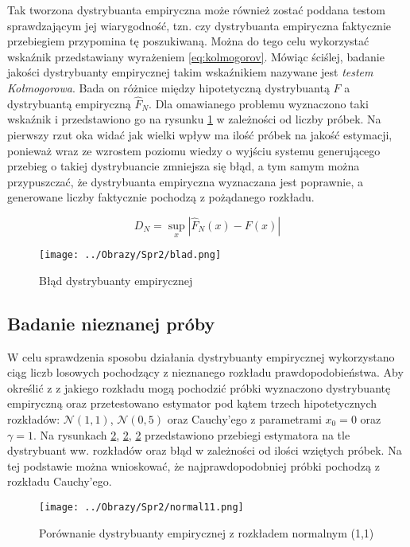 \documentclass[12pt,a4paper]{article}
\begin{document}
Tak tworzona dystrybuanta empiryczna może również zostać poddana testom sprawdzającym jej wiarygodność, tzn. czy dystrybuanta empiryczna faktycznie przebiegiem przypomina tę poszukiwaną.
Można do tego celu wykorzystać wskaźnik przedstawiany wyrażeniem \ref{eq:kolmogorov}.
Mówiąc ściślej, badanie jakości dystrybuanty empirycznej takim wskaźnikiem nazywane jest \textit{testem Kołmogorowa}.
Bada on różnice między hipotetyczną dystrybuantą $F$ a dystrybuantą empiryczną $\hat{F}_{N}$.
Dla omawianego problemu wyznaczono taki wskaźnik i przedstawiono go na rysunku \ref{fig:bladDystrybuanty} w zależności od liczby próbek.
Na pierwszy rzut oka widać jak wielki wpływ ma ilość próbek na jakość estymacji, ponieważ wraz ze wzrostem poziomu wiedzy o wyjściu systemu generującego przebieg o takiej dystrybuancie zmniejsza się błąd, a tym samym można przypuszczać, że dystrybuanta empiryczna wyznaczana jest poprawnie, a generowane liczby faktycznie pochodzą z pożądanego rozkładu.


\begin{equation}\label{eq:kolmogorov}
D_{N}=\sup_{x}|\hat{F}_{N}(x)-F(x)|
\end{equation}

\begin{figure}[H]
\centering
\texttt{[image: ../Obrazy/Spr2/blad.png]} 
\caption{Błąd dystrybuanty empirycznej}
\label{fig:bladDystrybuanty}
\end{figure}

\subsection{Badanie nieznanej próby}
W celu sprawdzenia sposobu działania dystrybuanty empirycznej wykorzystano ciąg liczb losowych pochodzący z nieznanego rozkładu prawdopodobieństwa.
Aby określić z z jakiego rozkładu mogą pochodzić próbki wyznaczono dystrybuantę empiryczną oraz przetestowano estymator pod kątem trzech hipotetycznych rozkładów: $\mathcal{N}(1,1)$, $\mathcal{N}(0,5)$ oraz Cauchy'ego z parametrami $x_{0}=0$ oraz $\gamma=1$.
Na rysunkach \ref{fig:normal11}, \ref{fig:normal11}, \ref{fig:normal11} przedstawiono przebiegi estymatora na tle dystrybuant ww. rozkładów oraz błąd w zależności od ilości wziętych próbek.
Na tej podstawie można wnioskować, że najprawdopodobniej próbki pochodzą z rozkładu Cauchy'ego.

\begin{figure}[H]
\centering
\texttt{[image: ../Obrazy/Spr2/normal11.png]} 
\caption{Porównanie dystrybuanty empirycznej z rozkładem normalnym (1,1)}
\label{fig:normal11}
\end{figure}
\end{document}
